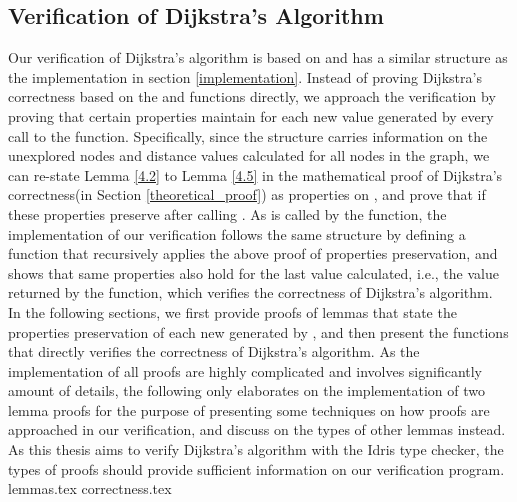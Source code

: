 \subsection{Verification of Dijkstra's Algorithm}
Our verification of Dijkstra's algorithm is based on and has a similar structure as the implementation in section \ref{implementation}. Instead of proving Dijkstra's correctness based on the  and  functions directly, we approach the verification by proving that certain properties maintain for each new  value generated by every call to the  function. Specifically, since the  structure carries information on the unexplored nodes and distance values calculated for all nodes in the graph, we can re-state Lemma \ref{4.2} to Lemma \ref{4.5} in the mathematical proof of Dijkstra's correctness(in Section \ref{theoretical_proof}) as properties on , and prove that if these properties preserve after calling . As  is called by the  function, the implementation of our verification follows the same structure by defining a function that recursively applies the above proof of properties preservation, and shows that same properties also hold for the last  value calculated, i.e., the value returned by the  function, which verifies the correctness of Dijkstra's algorithm. 
\\

In the following sections, we first provide proofs of lemmas that state the properties preservation of each new  generated by , and then present the functions that directly verifies the correctness of Dijkstra's algorithm. As the implementation of all proofs are highly complicated and involves significantly amount of details, the following only elaborates on the implementation of two lemma proofs for the purpose of presenting some techniques on how proofs are approached in our verification, and discuss on the types of other lemmas instead. As this thesis aims to verify Dijkstra's algorithm with the Idris type checker, the types of proofs should provide sufficient information on our verification program.
\\

{lemmas.tex}
{correctness.tex}


